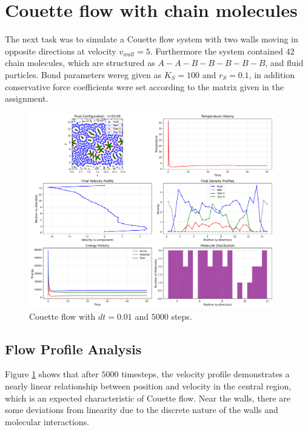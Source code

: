 \section{Couette flow with chain molecules}
The next task was to simulate a Couette flow system with two walls moving in opposite directions at velocity $v_{wall} = 5$. Furthermore the system contained $42$ chain molecules, which are structured as $A-A-B-B-B-B-B$, and fluid particles. Bond parameters wereg given as $K_S = 100$ and $r_S = 0.1$, in addition conservative force coefficients were set according to the matrix given in the assignment.
\begin{figure}[H]
	\begin{center}
		\includegraphics[width=0.95\textwidth]{figures/couette_final_vis.png}
	\end{center}
	\caption{Couette flow with $dt = 0.01$ and $5000$ steps.}\label{fig:couette}
\end{figure}
\subsection{Flow Profile Analysis}
Figure \ref{fig:couette} shows that after $5000$ timesteps, the velocity profile demonstrates a nearly linear relationship between position and velocity in the central region, which is an expected characteristic of Couette flow. Near the walls, there are some deviations from linearity due to the discrete nature of the walls and molecular interactions.
